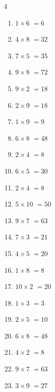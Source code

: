 \begin{multicols}{4}
\begin{enumerate}
  \item $1\times 6$
        $=6$

  \item $4\times 8$
        $=32$

  \item $7\times 5$
        $=35$

  \item $9\times 8$
        $=72$

  \item $9\times 2$
        $=18$

  \item $2\times 9$
        $=18$

  \item $1\times 9$
        $=9$

  \item $6\times 8$
        $=48$

  \item $2\times 4$
        $=8$

  \item $6\times 5$
        $=30$

  \item $2\times 4$
        $=8$

\columnbreak %

  \item $5\times 10$
        $=50$

  \item $9\times 7$
        $=63$

  \item $7\times 3$
        $=21$

  \item $4\times 5$
        $=20$

  \item $1\times 8$
        $=8$

  \item $10\times 2$
        $=20$

  \item $1\times 3$
        $=3$

  \item $2\times 5$
        $=10$

  \item $6\times 8$
        $=48$

  \item $4\times 2$
        $=8$

  \item $9\times 7$
        $=63$

  \item $3\times 9$
        $=27$


\end{enumerate}
\end{multicols}
